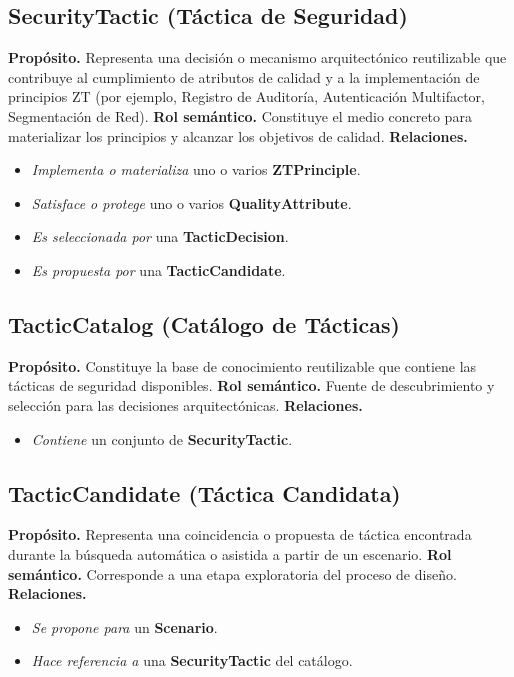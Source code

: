 \documentclass[12pt,letterpaper]{article}
\begin{document}
	\subsection{SecurityTactic (Táctica de Seguridad)}
	\textbf{Propósito.} Representa una decisión o mecanismo arquitectónico reutilizable que contribuye al cumplimiento de atributos de calidad y a la implementación de principios ZT (por ejemplo, Registro de Auditoría, Autenticación Multifactor, Segmentación de Red).  
	\textbf{Rol semántico.} Constituye el medio concreto para materializar los principios y alcanzar los objetivos de calidad.  
	\textbf{Relaciones.}
	\begin{itemize}[noitemsep]
		\item \emph{Implementa o materializa} uno o varios \textbf{ZTPrinciple}.
		\item \emph{Satisface o protege} uno o varios \textbf{QualityAttribute}.
		\item \emph{Es seleccionada por} una \textbf{TacticDecision}.
		\item \emph{Es propuesta por} una \textbf{TacticCandidate}.
	\end{itemize}
	
	\subsection{TacticCatalog (Catálogo de Tácticas)}
	\textbf{Propósito.} Constituye la base de conocimiento reutilizable que contiene las tácticas de seguridad disponibles.  
	\textbf{Rol semántico.} Fuente de descubrimiento y selección para las decisiones arquitectónicas.  
	\textbf{Relaciones.}
	\begin{itemize}[noitemsep]
		\item \emph{Contiene} un conjunto de \textbf{SecurityTactic}.
	\end{itemize}
	
	\subsection{TacticCandidate (Táctica Candidata)}
	\textbf{Propósito.} Representa una coincidencia o propuesta de táctica encontrada durante la búsqueda automática o asistida a partir de un escenario.  
	\textbf{Rol semántico.} Corresponde a una etapa exploratoria del proceso de diseño.  
	\textbf{Relaciones.}
	\begin{itemize}[noitemsep]
		\item \emph{Se propone para} un \textbf{Scenario}.
		\item \emph{Hace referencia a} una \textbf{SecurityTactic} del catálogo.
	\end{itemize}
	
\end{document}
